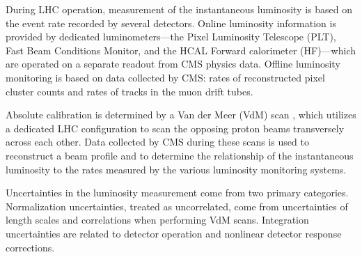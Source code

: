 During LHC operation, measurement of the instantaneous luminosity is based on the event rate recorded by several detectors. Online luminosity information is provided by dedicated luminometers---the Pixel Luminosity Telescope (PLT), Fast Beam Conditions Monitor, and the HCAL Forward calorimeter (HF)---which are operated on a separate readout from CMS physics data. Offline luminosity monitoring is based on data collected by CMS: rates of reconstructed pixel cluster counts and rates of tracks in the muon drift tubes\cite{Lujan:2647819}.

Absolute calibration is determined by a Van der Meer (VdM) scan \cite{vanderMeer:1968zz}\cite{Balagura:2011yw}, which utilizes a dedicated LHC configuration to scan the opposing proton beams transversely across each other. Data collected by CMS during these scans is used to reconstruct a beam profile and to determine the relationship of the instantaneous luminosity to the rates measured by the various luminosity monitoring systems.

Uncertainties in the luminosity measurement come from two primary categories. Normalization uncertainties, treated as uncorrelated, come from uncertainties of length scales and correlations when performing VdM scans. Integration uncertainties are related to detector operation and nonlinear detector response corrections\cite{CMS:2018elu}.